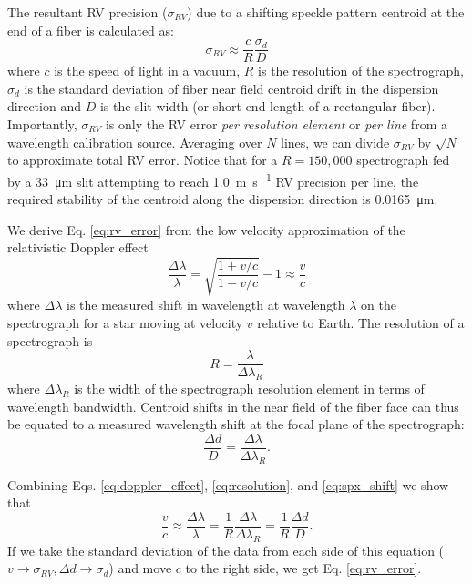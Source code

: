 \documentclass[twocolumn]{emulateapj}
\begin{document}
The resultant RV precision ($\sigma_{RV}$) due to a shifting speckle pattern centroid at the end of a fiber is calculated as:
\begin{equation}
\sigma_{RV} \approx \frac{c}{R} \frac{\sigma_d}{D}
\label{eq:rv_error}
\end{equation}
where $c$ is the speed of light in a vacuum, $R$ is the resolution of the spectrograph, $\sigma_d$ is the standard deviation of fiber near field centroid drift in the dispersion direction and $D$ is the slit width (or short-end length of a rectangular fiber). Importantly, $\sigma_{RV}$ is only the RV error \textit{per resolution element} or \textit{per line} from a wavelength calibration source. Averaging over $N$ lines, we can divide $\sigma_{RV}$ by $\sqrt{N}$ to approximate total RV error. Notice that for a $R=150,000$ spectrograph fed by a \SI{33}{\micro\meter} slit attempting to reach \SI{1.0}{\meter\per\second} RV precision per line, the required stability of the centroid along the dispersion direction is \SI{0.0165}{\micro\meter}.

We derive Eq. \ref{eq:rv_error} from the low velocity approximation of the relativistic Doppler effect
\begin{equation}
\frac{\Delta \lambda}{\lambda} = \sqrt{\frac{1 + v/c}{1-v/c}} - 1 \approx \frac{v}{c}
\label{eq:doppler_effect}
\end{equation}
where $\Delta \lambda$ is the measured shift in wavelength at wavelength $\lambda$ on the spectrograph for a star moving at velocity $v$ relative to Earth. The resolution of a spectrograph is
\begin{equation}
R = \frac{\lambda}{\Delta \lambda_R}
\label{eq:resolution}
\end{equation}
where $\Delta \lambda_R$ is the width of the spectrograph resolution element in terms of wavelength bandwidth. Centroid shifts in the near field of the fiber face can thus be equated to a measured wavelength shift at the focal plane of the spectrograph:
\begin{equation}
\frac{\Delta d}{D} = \frac{\Delta \lambda}{\Delta \lambda_R}.
\label{eq:spx_shift}
\end{equation}

Combining Eqs. \ref{eq:doppler_effect}, \ref{eq:resolution}, and \ref{eq:spx_shift} we show that
\begin{equation}
\frac{v}{c} \approx \frac{\Delta \lambda}{\lambda} = \frac{1}{R} \frac{\Delta \lambda}{\Delta \lambda_R} = \frac{1}{R} \frac{\Delta d}{D}.
\end{equation}
If we take the standard deviation of the data from each side of this equation ($v \rightarrow \sigma_{RV}, \Delta d \rightarrow \sigma_d$) and move $c$ to the right side, we get Eq. \ref{eq:rv_error}.
\end{document}

